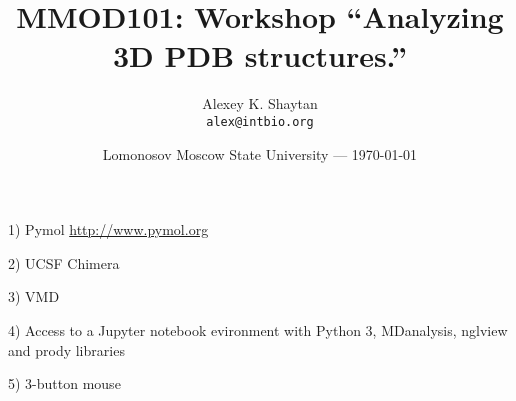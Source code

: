 \documentclass{article}
\title{MMOD101: Workshop ``Analyzing 3D PDB structures.''} %
\author{Alexey K. Shaytan\\ \texttt{alex@intbio.org}} %
\date{Lomonosov Moscow State University --- \today} %
\begin{document}
\begin{warn}[Requirements:]

1) Pymol \url{http://www.pymol.org} 

2) UCSF Chimera

3) VMD

4) Access to a Jupyter notebook evironment with Python 3, MDanalysis, nglview and prody libraries

5) 3-button mouse
\end{warn}

\tableofcontents

\end{document}
